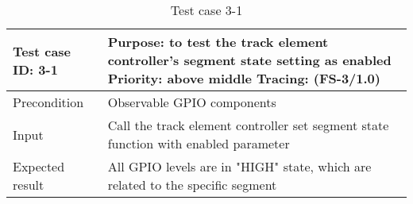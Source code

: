 \begin{table}[H]
	\caption{Test case 3-1}
	\label{table:TCase-FS3-01}
	\begin{center}
		\renewcommand{\arraystretch}{1.8}
		\begin{tabu} 
			to 0.9 \textwidth
			{  X[0.4, c] X[c] }
			\toprule
			Test case ID: 3-1 & Purpose: to test the track element controller's segment state setting as enabled \newline Priority: above middle \newline Tracing: (FS-3/1.0) \\ \midrule
			Precondition      & Observable GPIO components                                                                                                                    \\
			Input             & Call the track element controller set segment state function with enabled parameter                                                           \\
			Expected result   & All GPIO levels are in "HIGH" state, which are related to the specific segment                                                                \\ \bottomrule
		\end{tabu}
	\end{center}
\end{table}

